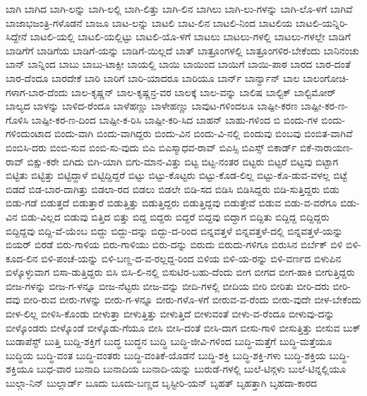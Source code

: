 {ಬಾಗಿ
ಬಾಗಿದ
ಬಾಗಿ-ಲನ್ನು
ಬಾಗಿ-ಲಲ್ಲಿ
ಬಾಗಿ-ಲಿತ್ತು
ಬಾಗಿ-ಲಿನ
ಬಾಗಿಲು
ಬಾಗಿ-ಲು-ಗಳನ್ನು
ಬಾಗಿ-ಲೊ-ಳಗೆ
ಬಾಗಿವೆ
ಬಾಜಾಭಜಂತ್ರಿ-ಗಳೊಡನೆ
ಬಾಜೂ
ಬಾಟ-ಲನ್ನು
ಬಾಟಲಿ
ಬಾಟ-ಲಿನ
ಬಾಟಲಿ-ನಿಂದ
ಬಾಟಲಿಯ
ಬಾಟಲಿ-ಯನ್ನಿರಿ-ಸಿದ್ದೇನೆ
ಬಾಟಲಿ-ಯಲ್ಲಿ
ಬಾಟಲಿ-ಯಲ್ಲಿಟ್ಟು
ಬಾಟಲಿ-ಯೊ-ಳಗೆ
ಬಾಟಲು
ಬಾಟಲು-ಗಳಲ್ಲಿ
ಬಾಟಲು-ಗಳಲ್ಲೇ
ಬಾಡಿಗೆ
ಬಾಡಿಗೆಗೆ
ಬಾಡಿಗೆಯ
ಬಾಡಿಗೆ-ಯನ್ನು
ಬಾಡಿಗೆ-ಯಿಲ್ಲದೆ
ಬಾತ್
ಬಾತ್ರೂಂಗಳಲ್ಲಿ
ಬಾತ್ರೂಂಗಳಿರ-ಬೇಕೆಂದು
ಬಾನಿನಂಚು
ಬಾನ್
ಬಾನ್ನಿಂದ
ಬಾಬು
ಬಾಬು-ಟಾಕ್ಸೀ
ಬಾಯಲ್ಲಿ
ಬಾಯಿ
ಬಾಯಿಂದ
ಬಾಯಿಗೆ
ಬಾಯಿ-ಪಾಠ
ಬಾರದ
ಬಾರ-ದಂತೆ
ಬಾರ-ದೆಂದೂ
ಬಾರದೇಕೆ
ಬಾರಿ
ಬಾರಿಗೆ
ಬಾರಿ-ಯಾದರೂ
ಬಾರಿಯೂ
ಬಾರ್ನ್
ಬಾರ್ನ್ವಾನ್
ಬಾಲ
ಬಾಲಂಗೋಚಿ-ಗಳಾಗ-ಬಾರ-ದೆಂದು
ಬಾಲ-ಕೃಷ್ಣನ್
ಬಾಲ-ಕೃಷ್ಣನ್ರ-ವರ
ಬಾಲಕ್ಕೆ
ಬಾಲ-ವನ್ನು
ಬಾಲಿಷ
ಬಾಲ್ಟಿಕ್
ಬಾಲ್ಟಿಮೋರ್
ಬಾಲ್ಯದ
ಬಾಳನ್ನು
ಬಾಳಿದ-ರೆಂದೂ
ಬಾಳೆಹಣ್ಣು
ಬಾಳೇಹಣ್ಣು
ಬಾವುಟ-ಗಳಿಂದಲೂ
ಬಾಷ್ಪೀ-ಕರಣ
ಬಾಷ್ಪೀ-ಕರ-ಣ-ಗೊಳಿಸಿ
ಬಾಷ್ಪೀ-ಕರ-ಣ-ದಿಂದ
ಬಾಷ್ಪೀ-ಕ-ರಿಸಿ
ಬಾಷ್ಪೀ-ಕರಿ-ಸಿದ
ಬಾಹನ್
ಬಾಹು-ಗಳಿಂದ
ಬಿ
ಬಿಂದು-ಗಳ
ಬಿಂದು-ಗಳಿಂದುಂಟಾದ
ಬಿಂದು-ವಾಗಿ
ಬಿಂದು-ವಾಗಿದ್ದರು
ಬಿಂದು-ವಿನ
ಬಿಂದು-ವಿ-ನಲ್ಲಿ
ಬಿಂದುವು
ಬಿಂಬವು
ಬಿಂಬಿತ-ವಾಗಿವೆ
ಬಿಂಬಿಸಿ-ದರು
ಬಿಂಬಿ-ಸುವ
ಬಿಂಬಿ-ಸು-ವುದು
ಬಿಎ
ಬಿಎಸ್ಮಾಧವ-ರಾವ್
ಬಿಎಸ್ಸಿ
ಬಿಎಸ್ಸ್
ಬಿಕಾರ್ಡ್
ಬಿಕೆ-ನಾರಾಯಣ-ರಾವ್
ಬಿಕ್ಷು-ಕರೇ
ಬಿಗಿದು
ಬಿಗಿ-ಯಾಗಿ
ಬಿಗು-ಮಾನ-ವಿತ್ತು
ಬಿಟ್ಟ
ಬಿಟ್ಟ-ನಂತರ
ಬಿಟ್ಟರು
ಬಿಟ್ಟರೆ
ಬಿಟ್ಟವು
ಬಿಟ್ಟಾಗ
ಬಿಟ್ಟಿತು
ಬಿಟ್ಟಿತ್ತು
ಬಿಟ್ಟಿದ್ದಾಳೆ
ಬಿಟ್ಟಿದ್ದಿದ್ದರೆ
ಬಿಟ್ಟು
ಬಿಟ್ಟು-ಕೊಟ್ಟರು
ಬಿಟ್ಟು-ಕೊಡ-ಲಿಲ್ಲ
ಬಿಟ್ಟು-ಕೊ-ಡುವ-ವಳಲ್ಲ
ಬಿಟ್ಟೆ
ಬಿಡದೆ
ಬಿಡ-ಬಾರ-ದಾಗಿತ್ತು
ಬಿಡಲಾ-ರದ
ಬಿಡಲು
ಬಿಡಲೇ
ಬಿಡಿ-ಸದ
ಬಿಡಿಸಿ
ಬಿಡಿಸಿದ್ದರು
ಬಿಡಿ-ಸುತ್ತಿದ್ದರು
ಬಿಡು
ಬಿಡು-ಗಡೆ
ಬಿಡುತ್ತದೆ
ಬಿಡುತ್ತಾರೆ
ಬಿಡುತ್ತಿತ್ತು
ಬಿಡುತ್ತಿದ್ದರು
ಬಿಡುತ್ತಿದ್ದವು
ಬಿಡುತ್ತೇವೆ
ಬಿಡುವ
ಬಿಡು-ವ-ವರೆಗೂ
ಬಿಡು-ವಿನ
ಬಿಡು-ವಿಲ್ಲದ
ಬಿಡುವು
ಬಿತ್ತಿದ
ಬಿತ್ತು
ಬಿದ್ದ
ಬಿದ್ದರು
ಬಿದ್ದರೆ
ಬಿದ್ದವು
ಬಿದ್ದಾಗ
ಬಿದ್ದಿತು
ಬಿದ್ದಿದ್ದ
ಬಿದ್ದಿದ್ದರು
ಬಿದ್ದಿದ್ದವು
ಬಿದ್ದಿ-ವೆ-ಯೆಂಬ
ಬಿದ್ದು
ಬಿದ್ದು-ದನ್ನು
ಬಿದ್ದು-ದ-ರಿಂದ
ಬಿನ್ನವತ್ತಳೆ
ಬಿನ್ನವತ್ತಳೆ-ದಲ್ಲಿ
ಬಿನ್ನವತ್ತಳೆ-ಯನ್ನು
ಬಿಯರ್
ಬಿರಡೆ
ಬಿರು-ಗಾಳಿಯ
ಬಿರು-ಗಾಳಿಯು
ಬಿರು-ದನ್ನು
ಬಿರುದು
ಬಿರುದು-ಗಳಿಗೂ
ಬಿರುಸಿನ
ಬಿರ್ಬೆಕ್
ಬಿಳಿ
ಬಿಳಿ-ಕೂದ-ಲಿನ
ಬಿಳಿ-ಪಂಚೆ-ಯನ್ನು
ಬಿಳಿ-ಬಣ್ಣ-ದ-ವ-ರಲ್ಲದ್ದ-ರಿಂದ
ಬಿಳಿಯ
ಬಿಳಿ-ಯ-ರನ್ನು
ಬಿಳಿ-ವರ್ಣದ
ಬಿಳುಪಿನ
ಬಿಳ್ಕೊಳ್ಳುವಾಗ
ಬಿಸಾ-ಡುತ್ತಿದ್ದರು
ಬಿಸಿ
ಬಿಸಿ-ಲಿ-ನಲ್ಲಿ
ಬಿಸುಟಿರ-ಬಹು-ದೆಂದು
ಬೀಗ
ಬೀಗದ
ಬೀಗ-ಹಾಕಿ
ಬೀಗುತ್ತಿದ್ದರು
ಬೀಜ-ಗಳನ್ನು
ಬೀಜ-ಗ-ಳನ್ನೂ
ಬೀಜ-ನೆಟ್ಟರು
ಬೀಜ-ವನ್ನು
ಬೀದಿ-ಗಳಲ್ಲಿ
ಬೀದಿಯ
ಬೀರಿ
ಬೀರಿತು
ಬೀರಿ-ದರು
ಬೀರಿ-ದವು
ಬೀರಿ-ರುವ
ಬೀರು-ಗಳನ್ನು
ಬೀರು-ಗ-ಳನ್ನೂ
ಬೀರು-ಗಳೊ-ಳಗೆ
ಬೀರುವ-ವ-ರೆಂದು
ಬೀರು-ವುದೇ
ಬೀಳ-ಬೇಕೆಂದು
ಬೀಳ-ಲಿಲ್ಲ
ಬೀಳಿಸಿ-ಕೊಂಡು
ಬೀಳುತ್ತಾ
ಬೀಳುತ್ತಿತ್ತು
ಬೀಳುತ್ತಿದೆ
ಬೀಳುವಂತೆ
ಬೀಳು-ವ-ರೆಂದೂ
ಬೀಳುವು-ದನ್ನು
ಬೀಳ್ಕೊಂಡರು
ಬೀಳ್ಕೊಂಡೆ
ಬೀಳ್ಕೊಡು-ಗೆಯೂ
ಬೀಸಿ
ಬೀಸಿ-ದಂತೆ
ಬೀಸಿ-ದಾಗ
ಬೀಸು-ಗಾಳಿ
ಬೀಸುತ್ತಿತ್ತು
ಬೀಸುವ
ಬುಕ್
ಬುಡಾಪೆಸ್ಟ್
ಬುತ್ತಿ
ಬುದ್ದಿ-ಶಕ್ತಿಗೆ
ಬುದ್ಧ
ಬುದ್ಧನ
ಬುದ್ಧಿ
ಬುದ್ಧಿ-ಜೀವಿ-ಗಳಿಂದ
ಬುದ್ಧಿ-ಮತ್ತೆಗೆ
ಬುದ್ಧಿ-ಮತ್ತೆಯೂ
ಬುದ್ಧಿಯ
ಬುದ್ಧಿ-ವಂತ
ಬುದ್ಧಿ-ವಂತರು
ಬುದ್ಧಿ-ವಂತಿಕೆ-ಯೊಡನೆ
ಬುದ್ಧಿ-ಶಕ್ತಿ
ಬುದ್ಧಿ-ಶಕ್ತಿ-ಗಳು
ಬುದ್ಧಿ-ಶಕ್ತಿಯ
ಬುದ್ಧಿ-ಶಕ್ತಿಯೂ
ಬುಧ-ವಾರ
ಬುನಾದಿ
ಬುನಾದಿಯ
ಬುನಾದಿ-ಯನ್ನು
ಬುರುಡೆ-ಗಳಲ್ಲಿ
ಬುಲೆ-ಟಿನ್ಗಳು
ಬುಲೆ-ಟಿನ್ನಲ್ಲಿಯೂ
ಬುಲ್ಗಾ-ನಿನ್
ಬುಲ್ಲಾರ್ಡ್
ಬೂದು
ಬೂದು-ಬಣ್ಣದ
ಬೃಸ್ಟೀರಿ-ಯನ್
ಬೃಹತ್
ಬೃಹತ್ತಾಗಿ
ಬೃಹದಾ-ಕಾರದ
}

